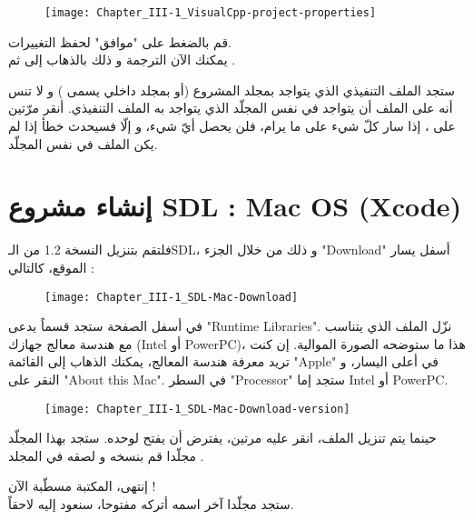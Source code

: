 \begin{figure}[H]
	\centering
	\texttt{[image: Chapter\_III-1\_VisualCpp-project-properties]}
\end{figure}


قم بالضغط على "موافق" لحفظ التغييرات.\\
يمكنك الآن الترجمة و ذلك بالذهاب إلى
ثم
.

ستجد الملف التنفيذي الذي يتواجد بمجلد المشروع (أو بمجلد داخلي يسمى
)
و لا تنس أنه على الملف
أن يتواجد في نفس المجلّد الذي يتواجد به الملف التنفيذي. أنقر مرّتين على
،
 إذا سار كلّ شيء على ما يرام، فلن يحصل أيّ شيء، و إلّا فسيحدث خطأ إذا لم يكن الملف
في نفس المجلّد.

\section{إنشاء مشروع \textenglish{SDL} : \textenglish{Mac OS} (\textenglish{Xcode})}

فلتقم بتنزيل النسخة 1.2 من الـ\textenglish{SDL}،
و ذلك من خلال الجزء
"\textenglish{Download}"
أسفل يسار الموقع، كالتالي :

\begin{figure}[H]
	\centering
	\texttt{[image: Chapter\_III-1\_SDL-Mac-Download]}
\end{figure}

في أسفل الصفحة ستجد قسماً يدعى 
"\textenglish{Runtime Libraries}".
نزّل الملف الذي يتناسب مع هندسة معالج جهازك
(\textenglish{Intel} أو \textenglish{PowerPC})،
 هذا ما ستوضحه الصورة الموالية. إن كنت تريد معرفة هندسة المعالج، يمكنك الذهاب إلى القائمة 
"\textenglish{Apple}"
في أعلى اليسار، و النقر على 
"\textenglish{About this Mac}".
في السطر 
"\textenglish{Processor}"
ستجد إما
\textenglish{Intel} أو \textenglish{PowerPC}.

\begin{figure}[H]
	\centering
	\texttt{[image: Chapter\_III-1\_SDL-Mac-Download-version]}
\end{figure}

حينما يتم تنزيل الملف، انقر عليه مرتين، يفترض أن يفتح لوحده. ستجد بهذا المجلّد مجلّدا
قم بنسخه و لصقه في المجلد 
.

إنتهى، المكتبة مسطّبة الآن !\\
ستجد مجلّدا آخر اسمه 
أتركه مفتوحا، سنعود إليه لاحقاً.

